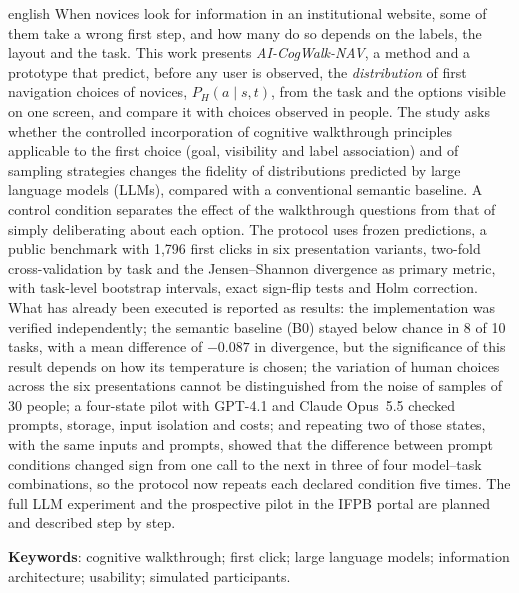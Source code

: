 \documentclass[12pt,oneside,a4paper,chapter=TITLE,english,brazil]{abntex2}
\newcommand{\proj}{AI-CogWalk-NAV}
\begin{document}
\begin{resumo}[Abstract]
\begin{otherlanguage*}{english}
When novices look for information in an institutional website, some of them take a wrong first step, and how many do so depends on the labels, the layout and the task. This work presents \textit{\proj}, a method and a prototype that predict, before any user is observed, the \emph{distribution} of first navigation choices of novices, $P_H(a \mid s, t)$, from the task and the options visible on one screen, and compare it with choices observed in people. The study asks whether the controlled incorporation of cognitive walkthrough principles applicable to the first choice (goal, visibility and label association) and of sampling strategies changes the fidelity of distributions predicted by large language models (LLMs), compared with a conventional semantic baseline. A control condition separates the effect of the walkthrough questions from that of simply deliberating about each option. The protocol uses frozen predictions, a public benchmark with 1,796 first clicks in six presentation variants, two-fold cross-validation by task and the Jensen--Shannon divergence as primary metric, with task-level bootstrap intervals, exact sign-flip tests and Holm correction. What has already been executed is reported as results: the implementation was verified independently; the semantic baseline (B0) stayed below chance in 8 of 10 tasks, with a mean difference of $-0.087$ in divergence, but the significance of this result depends on how its temperature is chosen; the variation of human choices across the six presentations cannot be distinguished from the noise of samples of 30 people; a four-state pilot with GPT-4.1 and Claude Opus~5.5 checked prompts, storage, input isolation and costs; and repeating two of those states, with the same inputs and prompts, showed that the difference between prompt conditions changed sign from one call to the next in three of four model--task combinations, so the protocol now repeats each declared condition five times. The full LLM experiment and the prospective pilot in the IFPB portal are planned and described step by step.

\textbf{Keywords}: cognitive walkthrough; first click; large language models; information architecture; usability; simulated participants.
\end{otherlanguage*}
\end{resumo}

\listoffigures*
\cleardoublepage
{}
\listoftables*
\cleardoublepage
\end{document}
